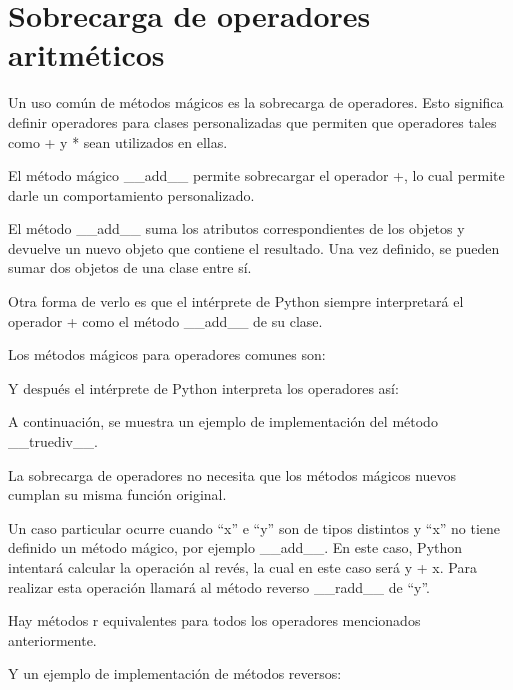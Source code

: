 \documentclass{report}
\newcommand{\doble}[1]{``#1''}
\begin{document}
\section{Sobrecarga de operadores aritméticos}

Un uso común de métodos mágicos es la sobrecarga de operadores. Esto significa definir operadores para clases personalizadas que permiten que operadores tales como + y * sean utilizados en ellas.\smallskip

El método mágico \_\_add\_\_ permite sobrecargar el operador +, lo cual permite darle un comportamiento personalizado.


El método \_\_add\_\_ suma los atributos correspondientes de los objetos y devuelve un nuevo objeto que contiene el resultado. Una vez definido, se pueden sumar dos objetos de una clase entre sí.\smallskip

Otra forma de verlo es que el intérprete de Python siempre interpretará el operador + como el método \_\_add\_\_ de su clase.\smallskip

Los métodos mágicos para operadores comunes son:


Y después el intérprete de Python interpreta los operadores así:


A continuación, se muestra un ejemplo de implementación del método \_\_truediv\_\_.


La sobrecarga de operadores no necesita que los métodos mágicos nuevos cumplan su misma función original.\smallskip

Un caso particular ocurre cuando \doble{x} e \doble{y} son de tipos distintos y \doble{x} no tiene definido un método mágico, por ejemplo \_\_add\_\_. En este caso, Python intentará calcular la operación al revés, la cual en este caso será y + x. Para realizar esta operación llamará al método reverso \_\_radd\_\_ de “y”.\smallskip

Hay métodos r equivalentes para todos los operadores mencionados anteriormente.


Y un ejemplo de implementación de métodos reversos:
\end{document}
